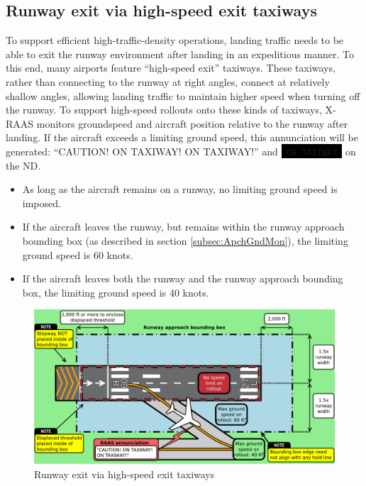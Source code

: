 \documentclass[a4paper,12pt]{article}
\newcommand{\visualadvisory}[3][b]{%
    \ifthenelse{\equal{#1}{b}}{\begin{center}}{}
    \noindent
    \colorbox{black}{\textcolor{#2visualadvisorycolor}{\large\texttt{~#3~}}}
    \ifthenelse{\equal{#1}{b}}{\end{center}}{}}
\begin{document}
\subsection{Runway exit via high-speed exit taxiways}
\label{subsec:HighSpeedExit}

To support efficient high-traffic-density operations, landing traffic
needs to be able to exit the runway environment after landing in an
expeditious manner. To this end, many airports feature ``high-speed
exit'' taxiways. These taxiways, rather than connecting to the runway at
right angles, connect at relatively shallow angles, allowing landing
traffic to maintain higher speed when turning off the runway. To support
high-speed rollouts onto these kinds of taxiways, X-RAAS monitors
groundspeed and aircraft position relative to the runway after landing.
If the aircraft exceeds a limiting ground speed, this annunciation will
be generated: ``CAUTION! ON TAXIWAY! ON TAXIWAY!'' and
\visualadvisory[i]{nonroutine}{ON TAXIWAY} on the ND.

\begin{itemize}

\item As long as the aircraft remains on a runway, no limiting ground
speed is imposed.

\item If the aircraft leaves the runway, but remains within the runway
approach bounding box (as described in section \ref{subsec:ApchGndMon}),
the limiting ground speed is 60 knots.

\item If the aircraft leaves both the runway and the runway approach
bounding box, the limiting ground speed is 40 knots.

\end{itemize}

\begin{figure}[H]
\begin{center}
\includegraphics[width=\textwidth]{../src/taxi_offrwy.pdf}
\end{center}
\caption{Runway exit via high-speed exit taxiways}
\end{figure}
\end{document}
